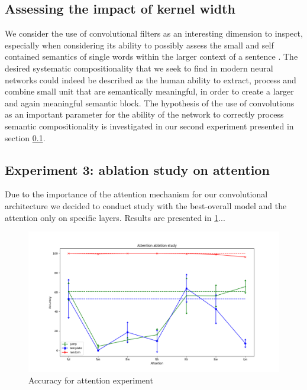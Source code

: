 \subsection{Assessing the impact of kernel width}
\label{subsec:exp2}


We consider the use of convolutional filters as an interesting dimension to inspect, especially when considering 
its ability to possibly assess the small and self contained semantics of single words within the larger context of a sentence \rd{\dots make a proper example with SCAN]}.
The desired systematic compositionality that we seek to find in modern neural networks could indeed be described as the
human ability to extract, process and combine small unit that are semantically meaningful, in order to create a larger and again meaningful semantic block.
The hypothesis of the use of convolutions as an important parameter for the ability of the network
to correctly process semantic compositionality is investigated in our second experiment presented in section \ref{subsec:exp2}.

\subsection{Experiment 3: ablation study on attention}
\label{subsec:exp3}

Due to the importance of the attention mechanism for our convolutional architecture we decided to conduct study with the best-overall model
and the attention only on specific layers. Results are presented in \ref{fig:exp3}...

\begin{figure}[h]
    \centering
    \includegraphics[width=.5\textwidth,keepaspectratio]{figures/attention_exp.png}
    \caption{Accuracy for attention experiment}
    \label{fig:exp3}
\end{figure}

